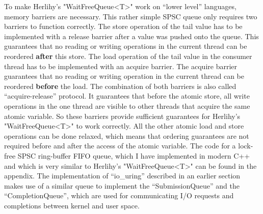 To make Herlihy’s "WaitFreeQueue<T>" work on “lower level” languages, memory barriers are necessary. This rather simple SPSC queue only requires two barriers to function correctly. The store operation of the tail value has to be implemented with a release barrier after a value was pushed onto the queue. This guarantees that no reading or writing operations in the current thread can be reordered \textbf{after} this store. The load operation of the tail value in the consumer thread has to be implemented with an acquire barrier. The acquire barrier guarantees that no reading or writing operation in the current thread can be reordered \textbf{before} the load. The combination of both barriers is also called “acquire-release” protocol. It guarantees that before the atomic store, all write operations in the one thread are visible to other threads that acquire the same atomic variable. So these barriers provide sufficient guarantees for Herlihy’s "WaitFreeQueue<T>" to work correctly. All the other atomic load and store operations can be done relaxed, which means that ordering guarantees are not required before and after the access of the atomic variable. The code for a lock-free SPSC ring-buffer FIFO queue, which I have implemented in modern C++ and which is very similar to Herlihy’s "WaitFreeQueue<T>" can be found in the appendix. The implementation of “io\_uring” described in an earlier section makes use of a similar queue to implement the “SubmissionQueue” and the “CompletionQueue”, which are used for communicating I/O requests and completions between kernel and user space.
